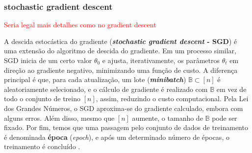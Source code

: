 \documentclass{automatextcc}
\newcommand{\pumi}[1]{\textcolor{red}{#1}}
\begin{document}



\subsubsection{stochastic gradient descent}
\pumi{Seria legal mais detalhes como no gradient descent}

A descida estocástica do gradiente (\textbf{\textit{stochastic gradient descent} - SGD}) é uma extensão do algoritmo de descida do gradiente. Em um processo similar, SGD inicia de um certo valor $\theta_0$ e ajusta, iterativamente, os parâmetros $\theta_t$ em direção ao gradiente negativo, minimizando uma função de custo. A diferença principal é que, para cada atualização, um lote (\textbf{\textit{minibatch}}) $\mathds{B} \subset [n]$ é aleatoriamente selecionado, e o cálculo de gradiente é realizado com $\mathbb{B}$ em vez de todo o conjunto de treino $[n]$, assim, reduzindo o custo computacional. Pela Lei dos Grandes Números, o SGD aproxima-se do gradiente calculado, embora com alguns erros. Além disso, mesmo que $[n]$ aumente, o tamanho de $\mathbb{B}$ pode ser fixado. Por fim, temos que uma passagem pelo conjunto de dados de treinamento é denominada \textbf{época} (\textit{epoch}), e após um determinado número de épocas, o treinamento é concluído \citep{goodfellow2016, fan2021}.




\end{document}
